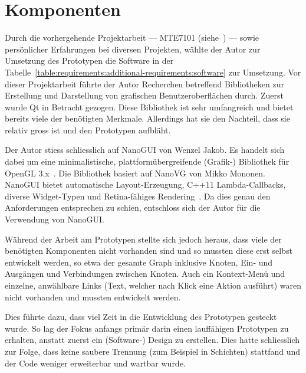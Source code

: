 
\section{Komponenten}
\label{sec:prototype:components}

Durch die vorhergehende Projektarbeit --- MTE7101
(siehe~\cite{osterwalder_sven_volume_2016}) --- sowie persönlicher Erfahrungen
bei diversen Projekten, wählte der Autor zur Umsetzung des Prototypen die
Software in der
Tabelle~\ref{table:requirements:additional-requirements:software} zur
Umsetzung. Vor dieser Projektarbeit führte der Autor Recherchen betreffend
Bibliotheken zur Erstellung und Darstellung von grafischen Benutzeroberflächen
durch. Zuerst wurde Qt in Betracht gezogen. Diese
Bibliothek ist sehr umfangreich und bietet bereits viele der benötigten
Merkmale. Allerdings hat sie den Nachteil, dass sie relativ gross ist und den
Prototypen aufbläht.

Der Autor stiess schliesslich auf NanoGUI von Wenzel Jakob. Es handelt sich
dabei um eine minimalistische, plattformübergreifende (Grafik-) Bibliothek für
OpenGL 3.x~\cite{jakob_wenzel_wjakob/nanogui:_2016}.  Die Bibliothek basiert
auf NanoVG von Mikko
Mononen.  NanoGUI bietet automatische Layout-Erzeugung, C++11 Lambda-Callbacks,
diverse Widget-Typen und Retina-fähiges
Rendering~\cite{jakob_wenzel_wjakob/nanogui:_2016}. Da dies genau den
Anforderungen entsprechen zu schien, entschloss sich der Autor für die
Verwendung von NanoGUI.\@

Während der Arbeit am Prototypen stellte sich jedoch heraus, dass viele der
benötigten Komponenten nicht vorhanden sind und so mussten diese erst selbst
entwickelt werden, so etwa der gesamte Graph inklusive Knoten, Ein- und
Ausgängen und Verbindungen zwischen Knoten. Auch ein Kontext-Menü und einzelne,
anwählbare Links (Text, welcher nach Klick eine Aktion ausführt) waren nicht
vorhanden und mussten entwickelt werden.

Dies führte dazu, dass viel Zeit in die Entwicklung des Prototypen gesteckt
wurde. So lag der Fokus anfangs primär darin einen lauffähigen Prototypen zu
erhalten, anstatt zuerst ein (Software-) Design zu erstellen. Dies hatte
schliesslich zur Folge, dass keine saubere Trennung (zum Beispiel in Schichten)
stattfand und der Code weniger erweiterbar und wartbar wurde.

